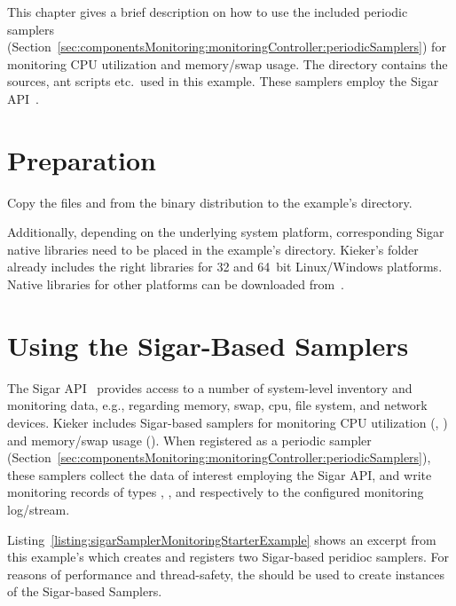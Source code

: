 This chapter gives a brief description on how to use the included %
periodic samplers (Section~\ref{sec:componentsMonitoring:monitoringController:periodicSamplers}) %
for monitoring CPU utilization and memory/swap usage. %
The directory \dir{\SigarExampleDirDistro/} contains the %
sources, ant scripts etc.\ used in this example. %
These samplers employ the Sigar API~\cite{HypericSigarWebsite}. \\%

\section{Preparation}

\begin{compactenum}
\item Copy the files \file{\mainJar} and \file{\sigarJar} from the %
binary distribution to the example's  directory.
\item Additionally, depending on the underlying system platform, %
corresponding Sigar native libraries need to be placed in the example's  directory. %
Kieker's  folder already includes the right libraries for 32 and 64~bit Linux/Windows platforms. %
Native libraries for other platforms can be downloaded from~\cite{HypericSigarWebsite}. %
\end{compactenum}

\section{Using the Sigar-Based Samplers}

The Sigar API~\cite{HypericSigarWebsite} provides access to a number of system-level inventory and monitoring data, %
e.g., regarding memory, swap, cpu, file system, and network devices. %
Kieker includes Sigar-based samplers %
for monitoring CPU utilization %
(, ) %
and memory/swap usage (). %
When registered as a periodic sampler (Section~\ref{sec:componentsMonitoring:monitoringController:periodicSamplers}), %
these samplers collect the data of interest employing the Sigar API, %
and write monitoring records of types , %
, and  respectively %
to the configured monitoring log/stream. %

Listing~\ref{listing:sigarSamplerMonitoringStarterExample} shows an excerpt from %
this example's  %
which creates and registers two Sigar-based peridioc samplers. %
For reasons of performance and thread-safety, the  %
should be used to create instances of the Sigar-based Samplers. 

